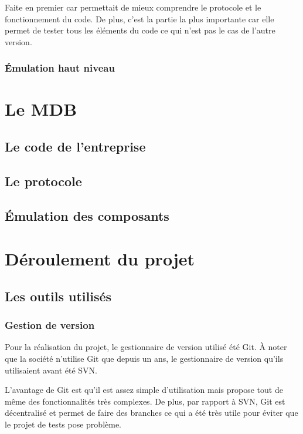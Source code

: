 \documentclass[a4paper]{article}
\begin{document}
Faite en premier car permettait de mieux comprendre le protocole et le
fonctionnement du code. De plus, c'est la partie la plus importante car elle
permet de tester tous les éléments du code ce qui n'est pas le cas de l'autre
version.

\subsubsection{Émulation haut niveau}

\section{Le MDB}

\subsection{Le code de l'entreprise}

\subsection{Le protocole}

\subsection{Émulation des composants}

\section{Déroulement du projet}

\subsection{Les outils utilisés}

\subsubsection{Gestion de version}

Pour la réalisation du projet, le gestionnaire de version utilisé été Git. À
noter que la société n'utilise Git que depuis un ans, le gestionnaire de version
qu'ils utilisaient avant été SVN.

L'avantage de Git est qu'il est assez simple d'utilisation mais propose tout de
même des fonctionnalités très complexes. De plus, par rapport à SVN, Git est
décentralisé et permet de faire des branches ce qui a été très utile pour éviter
que le projet de tests pose problème.
\end{document}
